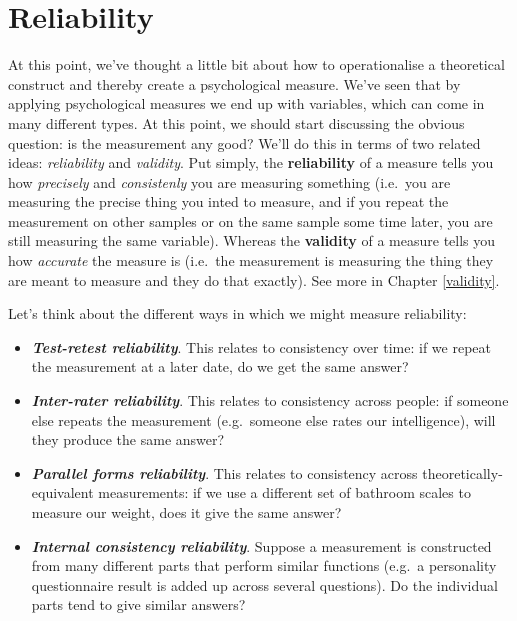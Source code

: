 \documentclass[
  11pt,
]{book}
\providecommand{\tightlist}{%
  \setlength{\itemsep}{0pt}\setlength{\parskip}{0pt}}
\theoremstyle{definition}
\theoremstyle{definition}
\theoremstyle{definition}
\theoremstyle{definition}
\theoremstyle{remark}
\begin{document}
\hypertarget{reliability}{%
\section{Reliability}\label{reliability}}

At this point, we've thought a little bit about how to operationalise a theoretical construct and thereby create a psychological measure. We've seen that by applying psychological measures we end up with variables, which can come in many different types. At this point, we should start discussing the obvious question: is the measurement any good? We'll do this in terms of two related ideas: \emph{reliability} and \emph{validity}. Put simply, the \textbf{reliability} of a measure tells you how \emph{precisely} and \emph{consistenly} you are measuring something (i.e.~you are measuring the precise thing you inted to measure, and if you repeat the measurement on other samples or on the same sample some time later, you are still measuring the same variable). Whereas the \textbf{validity} of a measure tells you how \emph{accurate} the measure is (i.e.~the measurement is measuring the thing they are meant to measure and they do that exactly). See more in Chapter \ref{validity}.

Let's think about the different ways in which we might measure reliability:

\begin{itemize}
\tightlist
\item
  \textbf{\emph{Test-retest reliability}}. This relates to consistency over time: if we repeat the measurement at a later date, do we get the same answer?
\item
  \textbf{\emph{Inter-rater reliability}}. This relates to consistency across people: if someone else repeats the measurement (e.g.~someone else rates our intelligence), will they produce the same answer?
\item
  \textbf{\emph{Parallel forms reliability}}. This relates to consistency across theoretically-equivalent measurements: if we use a different set of bathroom scales to measure our weight, does it give the same answer?
\item
  \textbf{\emph{Internal consistency reliability}}. Suppose a measurement is constructed from many different parts that perform similar functions (e.g.~a personality questionnaire result is added up across several questions). Do the individual parts tend to give similar answers?
\end{itemize}
\end{document}
